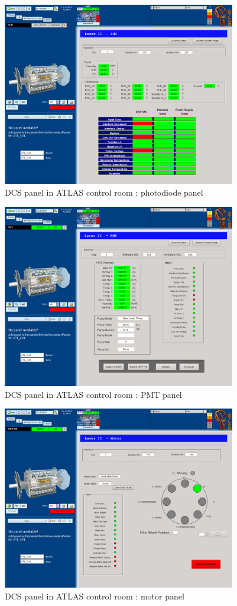 \begin{figure}[htbp]
\centering
\includegraphics[height=8cm]{figures/dcs_cr_phd.png}
\caption{DCS panel in ATLAS control room : photodiode panel}\label{fig:dcs_cr_b}
\end{figure}

\begin{figure}[htbp]
\centering
\includegraphics[height=8cm]{figures/dcs_cr_pmt.png}
\caption{DCS panel in ATLAS control room : PMT panel}\label{fig:dcs_cr_c}
\end{figure}

\begin{figure}[htbp]
\centering
\includegraphics[height=8cm]{figures/dcs_cr_motor.png}
\caption{DCS panel in ATLAS control room : motor panel}\label{fig:dcs_cr_d}
\end{figure}

